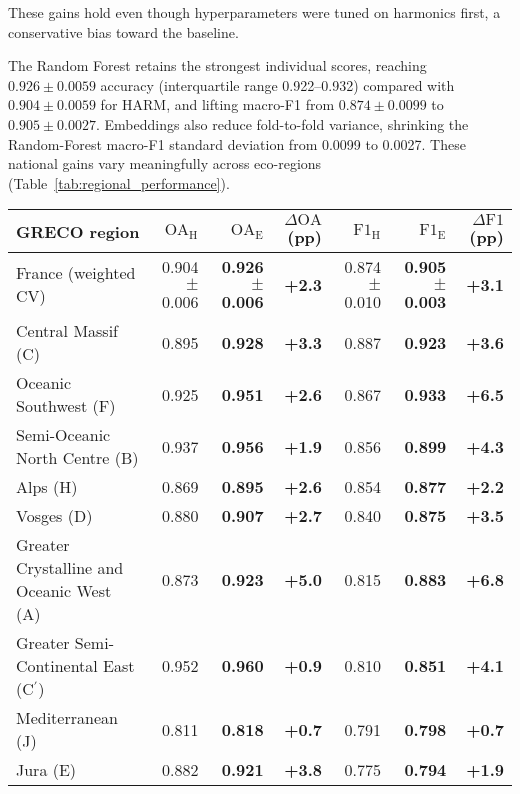 \documentclass[utf8]{FrontiersinHarvard}
\begin{document}
These gains hold even though hyperparameters were tuned on harmonics first, a conservative bias toward the baseline.

The Random Forest retains the strongest individual scores, reaching \(0.926 \pm 0.0059\) accuracy (interquartile range 0.922–0.932) compared with \(0.904 \pm 0.0059\) for HARM, and lifting macro-F1 from \(0.874 \pm 0.0099\) to \(0.905 \pm 0.0027\). Embeddings also reduce fold-to-fold variance, shrinking the Random-Forest macro-F1 standard deviation from 0.0099 to 0.0027. These national gains vary meaningfully across eco-regions (Table~\ref{tab:regional_performance}).
\begin{table}[H]
    \centering
    \small
    \begin{tabular}{lrrrrrr}
        \toprule
        \textbf{GRECO region} & $\mathrm{OA}_{\mathrm{H}}$ & $\mathrm{OA}_{\mathrm{E}}$ & $\Delta\mathrm{OA}$ (pp) & $\mathrm{F1}_{\mathrm{H}}$ & $\mathrm{F1}_{\mathrm{E}}$ & $\Delta\mathrm{F1}$ (pp) \\
        \midrule
        France (weighted CV) & 0.904 $\pm$ 0.006 & \textbf{0.926 $\pm$ 0.006} & \textbf{+2.3} & 0.874 $\pm$ 0.010 & \textbf{0.905 $\pm$ 0.003} & \textbf{+3.1} \\
        Central Massif (C) & 0.895 & \textbf{0.928} & \textbf{+3.3} & 0.887 & \textbf{0.923} & \textbf{+3.6} \\
        Oceanic Southwest (F) & 0.925 & \textbf{0.951} & \textbf{+2.6} & 0.867 & \textbf{0.933} & \textbf{+6.5} \\
        Semi-Oceanic North Centre (B) & 0.937 & \textbf{0.956} & \textbf{+1.9} & 0.856 & \textbf{0.899} & \textbf{+4.3} \\
        Alps (H) & 0.869 & \textbf{0.895} & \textbf{+2.6} & 0.854 & \textbf{0.877} & \textbf{+2.2} \\
        Vosges (D) & 0.880 & \textbf{0.907} & \textbf{+2.7} & 0.840 & \textbf{0.875} & \textbf{+3.5} \\
        Greater Crystalline and Oceanic West (A) & 0.873 & \textbf{0.923} & \textbf{+5.0} & 0.815 & \textbf{0.883} & \textbf{+6.8} \\
        Greater Semi-Continental East (C$^\prime$) & 0.952 & \textbf{0.960} & \textbf{+0.9} & 0.810 & \textbf{0.851} & \textbf{+4.1} \\
        Mediterranean (J) & 0.811 & \textbf{0.818} & \textbf{+0.7} & 0.791 & \textbf{0.798} & \textbf{+0.7} \\
        Jura (E) & 0.882 & \textbf{0.921} & \textbf{+3.8} & 0.775 & \textbf{0.794} & \textbf{+1.9} \\

\end{tabular}
\end{table}
\end{document}
